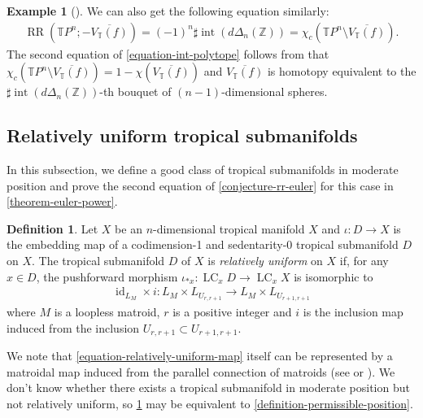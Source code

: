 \documentclass[a4paper,dvipdfmx,reqno,12pt]{amsart}
\theoremstyle{definition}
\newtheorem{definition}[theorem]{Definition}
\newtheorem{example}[theorem]{Example}
\newcommand{\opn}[1]{\operatorname{#1}}
\numberwithin{equation}{section}
\begin{document}
\begin{example}[{\cite[Example 2.11]{demedrano2023chern}}]
We can also get the following equation similarly:
\begin{align}
\label{equation-int-polytope}
\opn{RR}(\mathbb{T}P^{n};-\overline{V_{\mathbb{T}}(f)})=
(-1)^{n}\sharp \opn{int}(d\Delta_n(\mathbb{Z}))=
\chi_{c}(\mathbb{T}P^{n}\setminus
\overline{V_{\mathbb{T}}(f)}).
\end{align}
The second equation of \eqref{equation-int-polytope}
follows from that 
$\chi_{c}(\mathbb{T}P^{n}\setminus
\overline{V_{\mathbb{T}}(f)})
=1-\chi (\overline{V_{\mathbb{T}}(f)})$
and $\overline{V_{\mathbb{T}}(f)}$ is homotopy 
equivalent to the 
$\sharp \opn{int}(d\Delta_n(\mathbb{Z}))$-th
bouquet of $(n-1)$-dimensional spheres.
\end{example}


\subsection{Relatively uniform tropical submanifolds}
In this subsection, we define a good class
of tropical submanifolds in moderate position
and prove the second equation of
\cref{conjecture-rr-euler} for this case
in \cref{theorem-euler-power}. 
\begin{definition}
\label{definition-relatively-uniform}
Let $X$ be an $n$-dimensional tropical manifold $X$
and $\iota\colon D\to X$ is the embedding map of
a codimension-1 and sedentarity-0 tropical submanifold
$D$ on $X$.
The tropical submanifold $D$ of $X$
is \emph{relatively uniform} on $X$ if, for any $x\in D$, 
the pushforward morphism
$\iota_{*x}\colon\opn{LC}_{x}D\to \opn{LC}_{x}X$ is isomorphic to
\begin{align}
\label{equation-relatively-uniform-map}
\opn{id}_{L_M}\times i\colon L_{M}\times L_{U_{r,r+1}}\to 
L_{M}\times L_{U_{r+1,r+1}}
\end{align}
where
$M$ is a loopless matroid, $r$ is a positive integer
and $i$ is the inclusion map induced from the inclusion
$U_{r,r+1}\subset U_{r+1,r+1}$. 
\end{definition}




We note that \eqref{equation-relatively-uniform-map}
itself can be represented by a matroidal map
induced from the parallel connection of matroids
(see \cite[Lemma 3.1]{MR4246795}
or \cite[Proposition 3.7]{demedrano2023chern}).
We don't know whether there exists a
tropical submanifold in moderate position but
not relatively uniform, so
\cref{definition-relatively-uniform} may be equivalent
to \cref{definition-permissible-position}.
\end{document}
